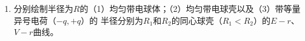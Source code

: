 \documentclass[UTF-8]{ctexart}
\begin{document}
\begin{enumerate}
    \item 分别绘制半径为\(R\)的（1）均匀带电球体；（2）均匀带电球壳以及（3）带等量异号电荷（\(-q,+q\)）的
        半径分别为\(R_1\)和\(R_2\)的同心球壳（\(R_1<R_2\)）的\(E-r\)、\(V-r\)曲线。
\end{enumerate}
\end{document}
